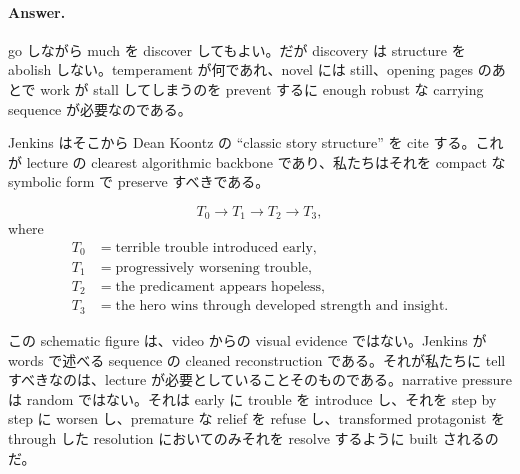 \paragraph{Answer.} go しながら much を discover してもよい。だが discovery は structure を abolish しない。temperament が何であれ、novel には still、opening pages のあとで work が stall してしまうのを prevent するに enough robust な carrying sequence が必要なのである。

Jenkins はそこから Dean Koontz の ``classic story structure'' を cite する。これが lecture の clearest algorithmic backbone であり、私たちはそれを compact な symbolic form で preserve すべきである。

\begin{equation}
T_0 \to T_1 \to T_2 \to T_3,
\end{equation}
where
\begin{align}
T_0&=\text{terrible trouble introduced early},\\
T_1&=\text{progressively worsening trouble},\\
T_2&=\text{the predicament appears hopeless},\\
T_3&=\text{the hero wins through developed strength and insight}.
\end{align}

\begin{figure}
\centering
{}
\end{figure}

この schematic figure は、video からの visual evidence ではない。Jenkins が words で述べる sequence の cleaned reconstruction である。それが私たちに tell すべきなのは、lecture が必要としていることそのものである。narrative pressure は random ではない。それは early に trouble を introduce し、それを step by step に worsen し、premature な relief を refuse し、transformed protagonist を through した resolution においてのみそれを resolve するように built されるのだ。

